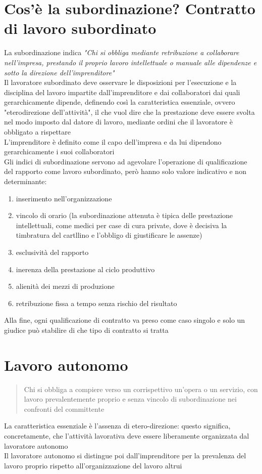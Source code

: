 \documentclass[8pt,oneside,a4paper]{article}
\begin{document}
	\section{Cos'è la subordinazione? Contratto di lavoro subordinato}
	La subordinazione indica \textit{"Chi si obbliga mediante retribuzione a collaborare nell'impresa, prestando il proprio lavoro intellettuale o manuale alle dipendenze e sotto la direzione dell'imprenditore"}\\
	Il lavoratore subordinato deve osservare le disposizioni per l'esecuzione e la disciplina del lavoro impartite dall'imprenditore e dai collaboratori dai quali gerarchicamente dipende, definendo così la caratteristica essenziale, ovvero "eterodirezione dell'attività", il che vuol dire che la prestazione deve essere svolta nel modo imposto dal datore di lavoro, mediante ordini che il lavoratore è obbligato a rispettare\\
	L'imprenditore è definito come il capo dell'impresa e da lui dipendono gerarchicamente i suoi collaboratori\\
	Gli indici di subordinazione servono ad agevolare l'operazione di qualificazione del rapporto come lavoro subordinato, però hanno solo valore indicativo e non determinante:
	\begin{enumerate}
		\item inserimento nell'organizzazione
		\item vincolo di orario (la subordinazione attenuta è tipica delle prestazione intellettuali, come medici per case di cura private, dove è decisiva la timbratura del cartllino e l'obbligo di giustificare le assenze)
		\item esclusività del rapporto
		\item inerenza della prestazione al ciclo produttivo
		\item alienità dei mezzi di produzione
		\item retribuzione fissa a tempo senza rischio del risultato
	\end{enumerate}
	Alla fine, ogni qualificazione di contratto va preso come caso singolo e solo un giudice può stabilire di che tipo di contratto si tratta
	\section{Lavoro autonomo}
	\begin{quote}
		Chi si obbliga a compiere verso un corrispettivo un'opera o un servizio, con lavoro prevalentemente proprio e senza vincolo di subordinazione nei confronti del committente
	\end{quote}
	La caratteristica essenziale è l'assenza di etero-direzione: questo significa, concretamente, che l'attività lavorativa deve essere liberamente organizzata dal lavoratore autonomo\\
	Il lavoratore autonomo si distingue poi dall'imprenditore per la prevalenza del lavoro proprio rispetto all'organizzazione del lavoro altrui
\end{document}
